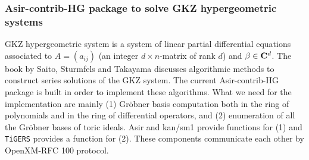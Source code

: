 %
%

\subsubsection{Asir-contrib-HG package to solve GKZ hypergeometric systems}

GKZ hypergeometric system is a system of linear partial differential
equations associated to $A=(a_{ij})$  
(an integer $d\times n$-matrix of rank $d$)
and $\beta \in {\bf C}^d$.
The book by Saito, Sturmfels and Takayama \cite{sst-book}
discusses algorithmic methods to construct series solutions of the GKZ
system.
The current Asir-contrib-HG package is built in order to implement
these algorithms.
What we need for the implementation are mainly
(1) Gr\"obner basis computation both in the ring of polynomials
and in the ring of differential operators,
and
(2) enumeration of all the Gr\"obner bases of toric ideals.
Asir and kan/sm1 provide functions for (1) and
{\tt TiGERS} provides a function for (2).
These components communicate each other by OpenXM-RFC 100 protocol.

